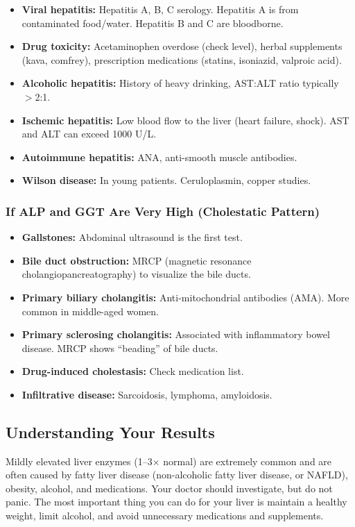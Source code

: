 \begin{itemize}
    \item \textbf{Viral hepatitis:} Hepatitis A, B, C serology. Hepatitis A is from contaminated food/water. Hepatitis B and C are bloodborne.
    \item \textbf{Drug toxicity:} Acetaminophen overdose (check level), herbal supplements (kava, comfrey), prescription medications (statins, isoniazid, valproic acid).
    \item \textbf{Alcoholic hepatitis:} History of heavy drinking, AST:ALT ratio typically $>$2:1.
    \item \textbf{Ischemic hepatitis:} Low blood flow to the liver (heart failure, shock). AST and ALT can exceed 1000 U/L.
    \item \textbf{Autoimmune hepatitis:} ANA, anti-smooth muscle antibodies.
    \item \textbf{Wilson disease:} In young patients. Ceruloplasmin, copper studies.
\end{itemize}

\subsubsection{If ALP and GGT Are Very High (Cholestatic Pattern)}

\begin{itemize}
    \item \textbf{Gallstones:} Abdominal ultrasound is the first test.
    \item \textbf{Bile duct obstruction:} MRCP (magnetic resonance cholangiopancreatography) to visualize the bile ducts.
    \item \textbf{Primary biliary cholangitis:} Anti-mitochondrial antibodies (AMA). More common in middle-aged women.
    \item \textbf{Primary sclerosing cholangitis:} Associated with inflammatory bowel disease. MRCP shows ``beading'' of bile ducts.
    \item \textbf{Drug-induced cholestasis:} Check medication list.
    \item \textbf{Infiltrative disease:} Sarcoidosis, lymphoma, amyloidosis.
\end{itemize}

\subsection{Understanding Your Results}

Mildly elevated liver enzymes (1--3$\times$ normal) are extremely common and are often caused by fatty liver disease (non-alcoholic fatty liver disease, or NAFLD), obesity, alcohol, and medications. Your doctor should investigate, but do not panic. The most important thing you can do for your liver is maintain a healthy weight, limit alcohol, and avoid unnecessary medications and supplements.

